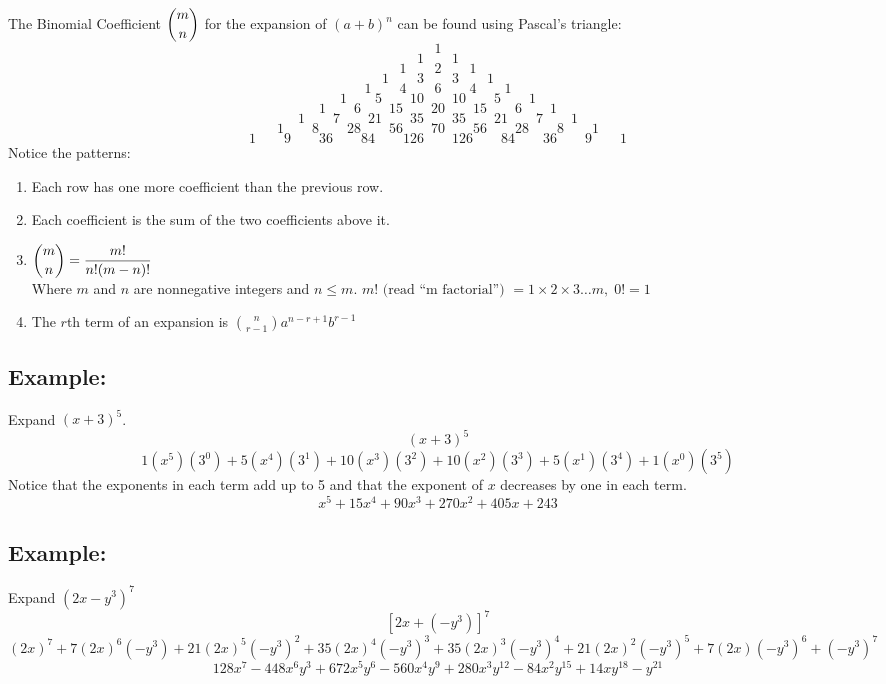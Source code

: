 \documentclass{amsart}
\begin{document}
\renewcommand{\headrulewidth}{0pt}
The Binomial Coefficient $\dbinom{m}{n}$ for the expansion of $(a+b)^n$ can be found using Pascal's triangle:
\[1\] \[1\qquad1\] \[1\qquad2\qquad1\] \[1\qquad3\qquad3\qquad1\] \[1\qquad4\qquad6\qquad4\qquad1\] \[1\qquad5\qquad10\qquad10\qquad5\qquad1\]
\[1\qquad6\qquad15\qquad20\qquad15\qquad6\qquad1\] \[1\qquad7\qquad21\qquad35\qquad35\qquad21\qquad7\qquad1\]
\[1\qquad8\qquad28\qquad56\qquad70\qquad56\qquad28\qquad8\qquad1\]
\[1\qquad9\qquad36\qquad84\qquad126\qquad126\qquad84\qquad36\qquad9\qquad1\]
Notice the patterns:
\begin{enumerate}
    \item Each row has one more coefficient than the previous row.
    \item Each coefficient is the sum of the two coefficients above it.
    \item $\dbinom{m}{n}=\dfrac{m!}{n!(m-n)!}$\\
    Where $m$ and $n$ are nonnegative integers and $n\le m$. $m!\text{ (read ``m factorial'') } = 1\times2\times3\ldots m,\; 0!=1$
    \item The $r$th term of an expansion is $\binom{n}{r-1}a^{n-r+1}b^{r-1}$
\end{enumerate}
\subsection*{Example:}Expand $(x+3)^5$.
\[(x+3)^5\]
\[1(x^5)(3^0)+5(x^4)(3^1)+10(x^3)(3^2)+10(x^2)(3^3)+5(x^1)(3^4)+1(x^0)(3^5)\]
Notice that the exponents in each term add up to 5 and that the exponent of $x$ decreases by one in each term.
\[x^5+15x^4+90x^3+270x^2+405x+243\]
\subsection*{Example:}Expand $(2x-y^3)^7$
\[\left[2x+(-y^3)\right] ^7\]
\[(2x)^7+7(2x)^6(-y^3)+21(2x)^5\left(-y^3\right)^2+35(2x)^4\left(-y^3\right) ^3 + 35(2x)^3\left(-y^3\right) ^4 + 21(2x)^2\left(-y^3\right)^5+7(2x)\left(-y^3\right)^6+\left(-y^3\right)^7\]
\[128x^7-448x^6y^3+672x^5y^6-560x^4y^9+280x^3y^{12}-84x^2y^{15}+14xy^{18}-y^{21}\]
\end{document}
